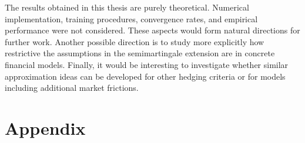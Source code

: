 \documentclass[11pt,a4paper,twoside,openany]{report}
\theoremstyle{plain} %
\theoremstyle{definition} %
\theoremstyle{remark} %
\begin{document}
The results obtained in this thesis are purely theoretical. Numerical implementation, training procedures, convergence rates, and empirical performance were not considered. These aspects would form natural directions for further work. Another possible direction is to study more explicitly how restrictive the assumptions in the semimartingale extension are in concrete financial models. Finally, it would be interesting to investigate whether similar approximation ideas can be developed for other hedging criteria or for models including additional market frictions.




\clearpage
\printbibliography
\clearpage
\appendix
\chapter{Appendix}
\end{document}
